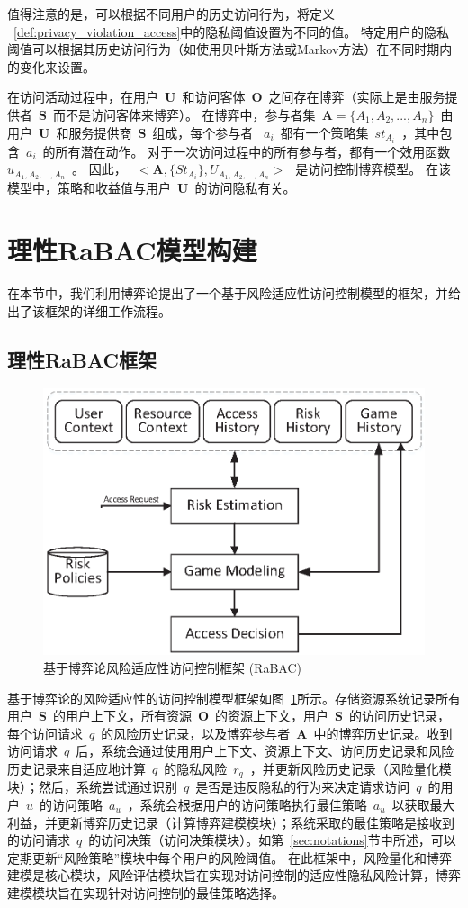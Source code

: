 值得注意的是，可以根据不同用户的历史访问行为，将定义 ~\ref{def:privacy_violation_access}中的隐私阈值设置为不同的值。 特定用户的隐私阈值可以根据其历史访问行为（如使用贝叶斯方法或Markov方法）在不同时期内的变化来设置。

在访问活动过程中，在用户~$\mathbf{U}$~和访问客体~$\mathbf{O}$~之间存在博弈（实际上是由服务提供者~$\mathbf{S}$~而不是访问客体来博弈）。 在博弈中，参与者集~$\mathbf{A}=\{A_1,A_2,...,A_n\}$~由用户~$\mathbf{U}$~和服务提供商~$\mathbf{S}$~组成，每个参与者 ~$a_i$~都有一个策略集~$st_{A_i}$~，其中包含~$a_i$~的所有潜在动作。 对于一次访问过程中的所有参与者，都有一个效用函数~$u_{A_1,A_2,...,A_n}$~。 因此，~$~<\mathbf{A},\{St_{A_i}\},U_{A_1,A_2,...,A_n}>~$~是访问控制博弈模型。 在该模型中，策略和收益值与用户~$\mathbf{U}$~的访问隐私有关。

\section{理性RaBAC模型构建}
\label{sec:framework}


在本节中，我们利用博弈论提出了一个基于风险适应性访问控制模型的框架，并给出了该框架的详细工作流程。
\subsection{理性RaBAC框架}
\label{sec:hlframework}
\begin{figure}[htb]
	\centering
	\includegraphics[width=.65\textwidth]{./figures/game-rbac-framework.eps}
	\caption{基于博弈论风险适应性访问控制框架 (RaBAC)}\label{fig:game-rbac-framework}
\end{figure}

基于博弈论的风险适应性的访问控制模型框架如图~\ref{fig:game-rbac-framework}所示。存储资源系统记录所有用户~$\mathbf{S}$~的用户上下文，所有资源~$\mathbf{O}$~的资源上下文，用户~$\mathbf{S}$~的访问历史记录，每个访问请求~$q$~的风险历史记录，以及博弈参与者~$\mathbf{A}$~中的博弈历史记录。收到访问请求~$q$~后，系统会通过使用用户上下文、资源上下文、访问历史记录和风险历史记录来自适应地计算~$q$~的隐私风险~$r_q$~，并更新风险历史记录（风险量化模块）；然后，系统尝试通过识别~$q$~是否是违反隐私的行为来决定请求访问~$q$~的用户~$u$~的访问策略~$a_u$~，系统会根据用户的访问策略执行最佳策略~$a_u$~以获取最大利益，并更新博弈历史记录（计算博弈建模模块）；系统采取的最佳策略是接收到的访问请求~$q$~的访问决策（访问决策模块）。如第~\ref{sec:notations}节中所述，可以定期更新“风险策略”模块中每个用户的风险阈值。
在此框架中，风险量化和博弈建模是核心模块，风险评估模块旨在实现对访问控制的适应性隐私风险计算，博弈建模模块旨在实现针对访问控制的最佳策略选择。


